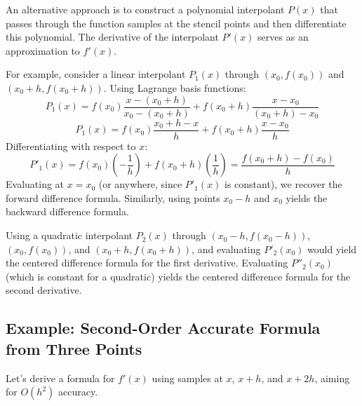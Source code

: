 \documentclass{article}
\begin{document}
An alternative approach is to construct a polynomial interpolant $P(x)$ that passes through the function samples at the stencil points and then differentiate this polynomial. The derivative of the interpolant $P'(x)$ serves as an approximation to $f'(x)$.

For example, consider a linear interpolant $P_1(x)$ through $(x_0, f(x_0))$ and $(x_0+h, f(x_0+h))$. Using Lagrange basis functions:
\[
P_1(x) = f(x_0) \frac{x - (x_0+h)}{x_0 - (x_0+h)} + f(x_0+h) \frac{x - x_0}{(x_0+h) - x_0}
\]
\[
P_1(x) = f(x_0) \frac{x_0+h - x}{h} + f(x_0+h) \frac{x - x_0}{h}
\]
Differentiating with respect to $x$:
\[
P'_1(x) = f(x_0) \left(-\frac{1}{h}\right) + f(x_0+h) \left(\frac{1}{h}\right) = \frac{f(x_0+h) - f(x_0)}{h}
\]
Evaluating at $x=x_0$ (or anywhere, since $P'_1(x)$ is constant), we recover the forward difference formula. Similarly, using points $x_0-h$ and $x_0$ yields the backward difference formula.

Using a quadratic interpolant $P_2(x)$ through $(x_0-h, f(x_0-h))$, $(x_0, f(x_0))$, and $(x_0+h, f(x_0+h))$, and evaluating $P'_2(x_0)$ would yield the centered difference formula for the first derivative. Evaluating $P''_2(x_0)$ (which is constant for a quadratic) yields the centered difference formula for the second derivative.

\subsection{Example: Second-Order Accurate Formula from Three Points}

Let's derive a formula for $f'(x)$ using samples at $x$, $x+h$, and $x+2h$, aiming for $O(h^2)$ accuracy.
\end{document}
